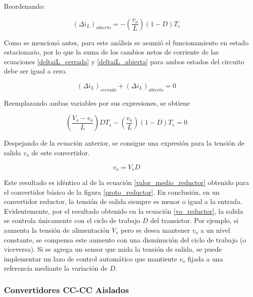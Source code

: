 Reordenando:

\begin{equation}\label{deltaiL_abierta}
    \boxed{
        (\Delta i_L)_{abierto} = -\left(\frac{v_o}{L}\right)(1-D)T_s
    }
\end{equation}

Como se mencionó antes, para este análisis se asumió el funcionamiento en estado estacionario, por lo que la suma de los cambios netos de corriente de las ecuaciones \ref{deltaiL_cerrada} y \ref{deltaiL_abierta} para ambos estados del circuito debe ser igual a cero.

\begin{equation}
    (\Delta i_L)_{cerrado} + (\Delta i_L)_{abierto} = 0
\end{equation}

Reemplazando ambas variables por sus expresiones, se obtiene

\begin{equation*}
    \left(\frac{V_s - v_o}{L}\right)DT_s - \left(\frac{v_o}{L}\right)(1-D)T_s  = 0
\end{equation*}

Despejando de la ecuación anterior, se consigue una expresión para la tensión de salida $v_o$ de este convertidor.

\begin{equation}\label{vo_reductor}
    \boxed{
        v_o = V_sD
    }
\end{equation}

Este resultado es idéntico al de la ecuación \ref{valor_medio_reductor} obtenido para el convertidor básico de la figura \ref{proto_reductor}. En conclusión, {\Medium en un convertidor reductor, la tensión de salida siempre es menor o igual a la entrada}.\\

Evidentemente, por el resultado obtenido en la ecuación \ref{vo_reductor}, la salida se controla únicamente con el ciclo de trabajo $D$ del transistor. Por ejemplo, si aumenta la tensión de alimentación $V_s$ pero se desea mantener $v_o$ a un nivel constante, se compensa este aumento con una disminución del ciclo de trabajo (o viceversa). Si se agrega un sensor que mida la tensión de salida, se puede implementar un lazo de control automático que mantiente $v_o$ fijada a una referencia mediante la variación de $D$.\\

\subsubsection{Convertidores CC-CC Aislados}

